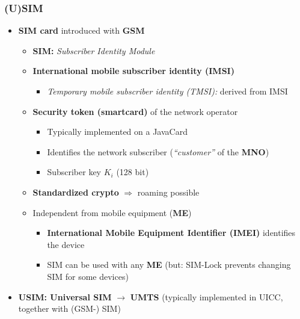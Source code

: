 \subsubsection{(U)SIM}
\begin{itemize}
    \item \textbf{SIM card} introduced with \textbf{GSM}
    \begin{itemize}
        \item \textbf{SIM:} \emph{Subscriber Identity Module}
        \item \textbf{International mobile subscriber identity (IMSI)}
        \begin{itemize}
            \item \emph{Temporary mobile subscriber identity (TMSI):} derived from IMSI
        \end{itemize}
        \item \textbf{Security token (smartcard)} of the network operator
        \begin{itemize}
            \item Typically implemented on a JavaCard
            \item Identifies the network subscriber (\emph{“customer”} of the \textbf{MNO})
            \item Subscriber key \(K_i\) (128 bit)
        \end{itemize}
        \item \textbf{Standardized crypto} \(\Rightarrow\) roaming possible
        \item Independent from mobile equipment (\textbf{ME})
        \begin{itemize}
            \item \textbf{International Mobile Equipment Identifier (IMEI)} identifies the device
            \item SIM can be used with any \textbf{ME} (but: SIM-Lock prevents changing SIM for some devices)
        \end{itemize}
    \end{itemize}
    \item \textbf{USIM: Universal SIM} \(\rightarrow\) \textbf{UMTS} (typically implemented in UICC, together with (GSM-) SIM)
\end{itemize}

